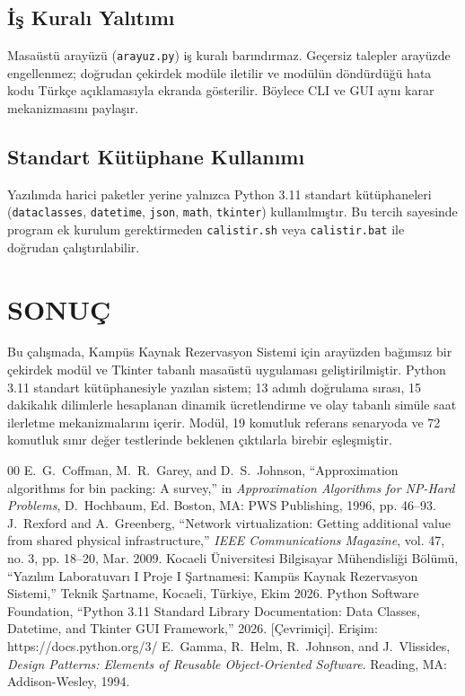 \documentclass[conference]{IEEEtran}
\begin{document}
\subsection{İş Kuralı Yalıtımı}
Masaüstü arayüzü (\texttt{arayuz.py}) iş kuralı barındırmaz. Geçersiz talepler arayüzde engellenmez; doğrudan çekirdek modüle iletilir ve modülün döndürdüğü hata kodu Türkçe açıklamasıyla ekranda gösterilir. Böylece CLI ve GUI aynı karar mekanizmasını paylaşır.

\subsection{Standart Kütüphane Kullanımı}
Yazılımda harici paketler yerine yalnızca Python 3.11 standart kütüphaneleri (\texttt{dataclasses}, \texttt{datetime}, \texttt{json}, \texttt{math}, \texttt{tkinter}) kullanılmıştır. Bu tercih sayesinde program ek kurulum gerektirmeden \texttt{calistir.sh} veya \texttt{calistir.bat} ile doğrudan çalıştırılabilir.

\section{SONUÇ}
Bu çalışmada, Kampüs Kaynak Rezervasyon Sistemi için arayüzden bağımsız bir çekirdek modül ve Tkinter tabanlı masaüstü uygulaması geliştirilmiştir. Python 3.11 standart kütüphanesiyle yazılan sistem; 13 adımlı doğrulama sırası, 15 dakikalık dilimlerle hesaplanan dinamik ücretlendirme ve olay tabanlı simüle saat ilerletme mekanizmalarını içerir. Modül, 19 komutluk referans senaryoda ve 72 komutluk sınır değer testlerinde beklenen çıktılarla birebir eşleşmiştir.

\begin{thebibliography}{00}
 E.~G.~Coffman, M.~R.~Garey, and D.~S.~Johnson, ``Approximation algorithms for bin packing: A survey,'' in \textit{Approximation Algorithms for NP-Hard Problems}, D.~Hochbaum, Ed. Boston, MA: PWS Publishing, 1996, pp. 46--93.
 J.~Rexford and A.~Greenberg, ``Network virtualization: Getting additional value from shared physical infrastructure,'' \textit{IEEE Communications Magazine}, vol. 47, no. 3, pp. 18--20, Mar. 2009.
 Kocaeli Üniversitesi Bilgisayar Mühendisliği Bölümü, ``Yazılım Laboratuvarı I Proje I Şartnamesi: Kampüs Kaynak Rezervasyon Sistemi,'' Teknik Şartname, Kocaeli, Türkiye, Ekim 2026.
 Python Software Foundation, ``Python 3.11 Standard Library Documentation: Data Classes, Datetime, and Tkinter GUI Framework,'' 2026. [Çevrimiçi]. Erişim: https://docs.python.org/3/
 E.~Gamma, R.~Helm, R.~Johnson, and J.~Vlissides, \textit{Design Patterns: Elements of Reusable Object-Oriented Software}. Reading, MA: Addison-Wesley, 1994.
\end{thebibliography}
\end{document}
